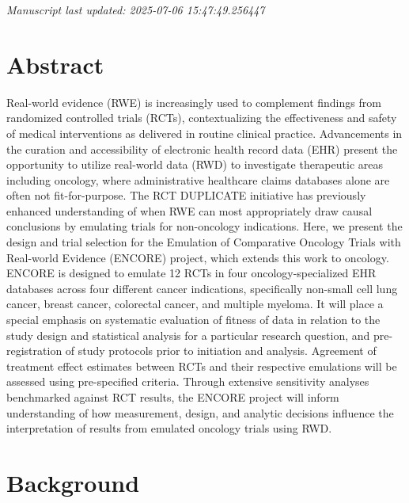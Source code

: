 \documentclass[
  letterpaper,
  DIV=11,
  numbers=noendperiod]{scrartcl}
\begin{document}
\emph{Manuscript last updated: 2025-07-06 15:47:49.256447}

\newpage{}

\section*{Abstract}\label{abstract}

Real-world evidence (RWE) is increasingly used to complement findings
from randomized controlled trials (RCTs), contextualizing the
effectiveness and safety of medical interventions as delivered in
routine clinical practice. Advancements in the curation and
accessibility of electronic health record data (EHR) present the
opportunity to utilize real-world data (RWD) to investigate therapeutic
areas including oncology, where administrative healthcare claims
databases alone are often not fit-for-purpose. The RCT DUPLICATE
initiative has previously enhanced understanding of when RWE can most
appropriately draw causal conclusions by emulating trials for
non-oncology indications. Here, we present the design and trial
selection for the Emulation of Comparative Oncology Trials with
Real-world Evidence (ENCORE) project, which extends this work to
oncology. ENCORE is designed to emulate 12 RCTs in four
oncology-specialized EHR databases across four different cancer
indications, specifically non-small cell lung cancer, breast cancer,
colorectal cancer, and multiple myeloma. It will place a special
emphasis on systematic evaluation of fitness of data in relation to the
study design and statistical analysis for a particular research
question, and pre-registration of study protocols prior to initiation
and analysis. Agreement of treatment effect estimates between RCTs and
their respective emulations will be assessed using pre-specified
criteria. Through extensive sensitivity analyses benchmarked against RCT
results, the ENCORE project will inform understanding of how
measurement, design, and analytic decisions influence the interpretation
of results from emulated oncology trials using RWD.

\newpage{}

\section{Background}\label{background}
\end{document}
